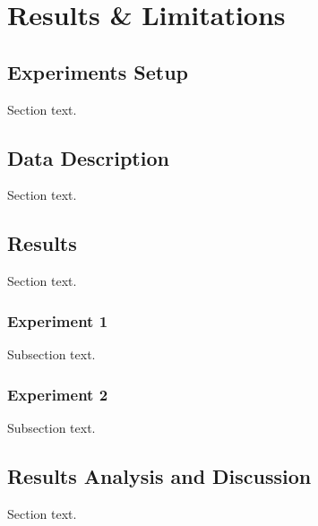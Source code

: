 \chapter{Results \& Limitations}
\label{chap:result}
\section{Experiments Setup}
Section text.

\section{Data Description}
Section text.

\section{Results}
Section text.

\subsection{Experiment 1}
Subsection text. 

\subsection{Experiment 2}
Subsection text.

\section{Results Analysis and Discussion}
Section text.
